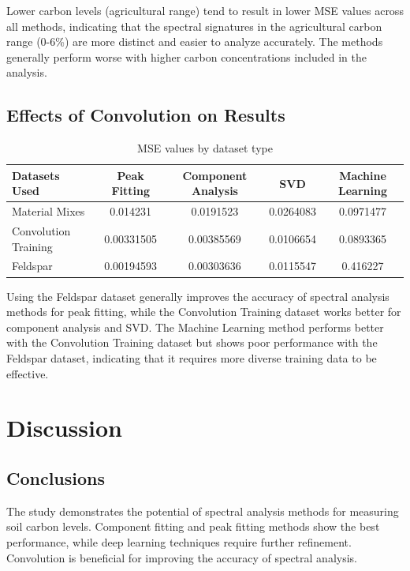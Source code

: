 \documentclass[review]{elsarticle}
\begin{document}
Lower carbon levels (agricultural range) tend to result in lower MSE values across all methods, indicating that the spectral signatures in the agricultural carbon range (0-6\%) are more distinct and easier to analyze accurately. The methods generally perform worse with higher carbon concentrations included in the analysis.

\subsection{Effects of Convolution on Results}

\begin{table}[H]
\centering
\caption{MSE values by dataset type}
\label{tab:convolution_results}
\begin{tabular}{@{}lcccc@{}}
\toprule
Datasets Used & Peak Fitting & Component Analysis & SVD & Machine Learning \\
\midrule
Material Mixes & 0.014231 & 0.0191523 & 0.0264083 & 0.0971477 \\
Convolution Training & 0.00331505 & 0.00385569 & 0.0106654 & 0.0893365 \\
Feldspar & 0.00194593 & 0.00303636 & 0.0115547 & 0.416227 \\
\bottomrule
\end{tabular}
\end{table}

Using the Feldspar dataset generally improves the accuracy of spectral analysis methods for peak fitting, while the Convolution Training dataset works better for component analysis and SVD. The Machine Learning method performs better with the Convolution Training dataset but shows poor performance with the Feldspar dataset, indicating that it requires more diverse training data to be effective.

\section{Discussion}

\subsection{Conclusions}

The study demonstrates the potential of spectral analysis methods for measuring soil carbon levels. Component fitting and peak fitting methods show the best performance, while deep learning techniques require further refinement. Convolution is beneficial for improving the accuracy of spectral analysis.
\end{document}
